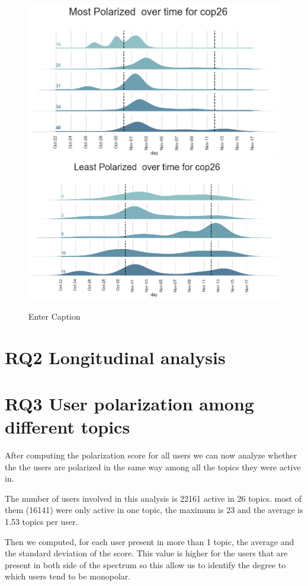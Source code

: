 \begin{figure}
    \centering
    \includegraphics[width=0.75\linewidth]{Chapter5/figures/ridge_most_26.png}
     \includegraphics[width=0.75\linewidth]{Chapter5/figures/ridge_least_26.png}
    \caption{Enter Caption}
    \label{fig:ridge_topics}
\end{figure}


\section{RQ2 Longitudinal analysis}



\section{RQ3 User polarization among different topics}
After computing the polarization score for all users we can now analyze whether the the users are polarized in the same way among all the topics they were active in.

The number of users involved in this analysis is 22161 active in 26 topics. most of them (16141) were only active in one topic, the maximum is 23 and the average is 1.53 topics per user. 

Then we computed, for each user present in more than 1 topic, the average and the standard deviation of the score. This value is higher for the users that are present in both side of the spectrum so this allow us to identify the degree to which users tend to be monopolar.

